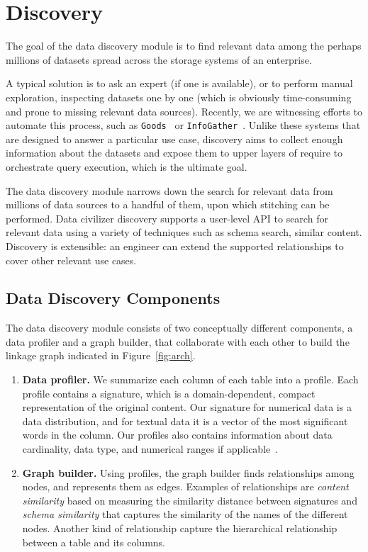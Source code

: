\section{Discovery}
\label{sec:discovery}

The goal of the data discovery module is to find relevant data among the perhaps millions of datasets spread across the storage systems of an enterprise. 

A typical solution is to ask an expert (if one is available), or to perform manual exploration, inspecting datasets one by one (which is obviously time-consuming and prone to missing relevant data sources). Recently, we are witnessing efforts to automate this process, such as \texttt{Goods}~\cite{DBLP:conf/sigmod/HalevyKNOPRW16} or \texttt{InfoGather}~\cite{ref}. Unlike these systems that are designed to answer a particular use case, discovery aims to collect enough information about the datasets and expose them to upper layers of \dcv require to orchestrate query execution, which is the ultimate goal.

The data discovery module narrows down the search for relevant data from millions of data sources to a handful of them, upon which stitching can be performed. Data civilizer discovery supports a user-level API to search for relevant data using a variety of techniques such as schema search, similar content. Discovery is extensible: an engineer can extend the supported relationships to cover other relevant use cases.

\subsection{Data Discovery Components}

The data discovery module consists of two conceptually different components, a data profiler and a graph builder, that collaborate with each other to build the linkage graph indicated in Figure~\ref{fig:arch}.

\begin{enumerate}
\item {\bf Data profiler.} We summarize each column of each table into a profile. Each profile contains a signature, which is a domain-dependent, compact representation of the original content. Our signature for numerical data is a data distribution, and for textual data it is a vector of the most significant words in the column. Our profiles also contains information about data cardinality, data type, and numerical ranges if applicable~\cite{profiling_survey}.  

\item {\bf Graph builder.} Using profiles, the graph builder finds relationships among nodes, and represents them as edges. Examples of relationships are \emph{content similarity} based on measuring the similarity distance between signatures and \emph{schema similarity} that captures the similarity of the names of the different nodes. Another kind of relationship capture the hierarchical relationship between a table and its columns. 

\end{enumerate}


